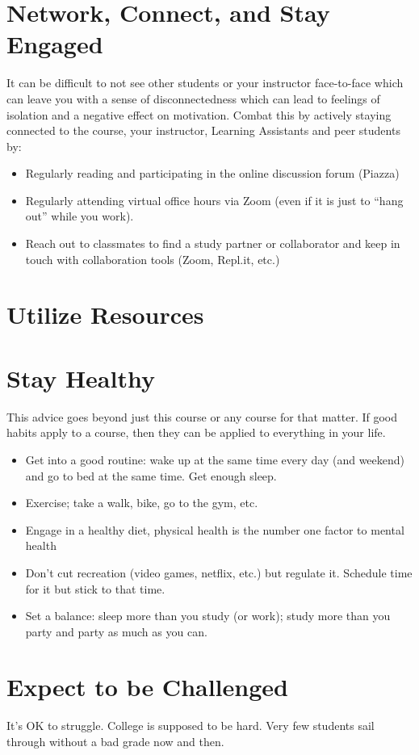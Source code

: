 \documentclass[12pt]{scrartcl}
\begin{document}
\section{Network, Connect, and Stay Engaged}

It can be difficult to not see other students or your instructor face-to-face
which can leave you with a sense of disconnectedness which can lead to feelings
of isolation and a negative effect on motivation.  Combat this by actively 
staying connected to the course, your instructor, Learning Assistants and peer
students by:

\begin{itemize}
  \item Regularly reading and participating in the online discussion forum (Piazza)
  \item Regularly attending virtual office hours via Zoom (even if it is just
  to ``hang out'' while you work).  
  \item Reach out to classmates to find a study partner or collaborator and keep
  in touch with collaboration tools (Zoom, Repl.it, etc.)
\end{itemize}

\section{Utilize Resources}

\section{Stay Healthy}

This advice goes beyond just this course or any course for that matter.  If
good habits apply to a course, then they can be applied to everything in your
life.  

\begin{itemize}
  \item Get into a good routine: wake up at the same time every day (and weekend)
  and go to bed at the same time.   Get enough sleep.
  \item Exercise; take a walk, bike, go to the gym, etc.
  \item Engage in a healthy diet, physical health is the number one factor to
  mental health
  \item Don't cut recreation (video games, netflix, etc.) but regulate it.  
  Schedule time for it but stick to that time.  
  \item Set a balance: sleep more than you study (or work); study more than you party
  and party as much as you can.
\end{itemize}

\section{Expect to be Challenged}
It's OK to struggle. College is supposed to be hard. Very few students sail through without a bad grade now and then. 
\end{document}
